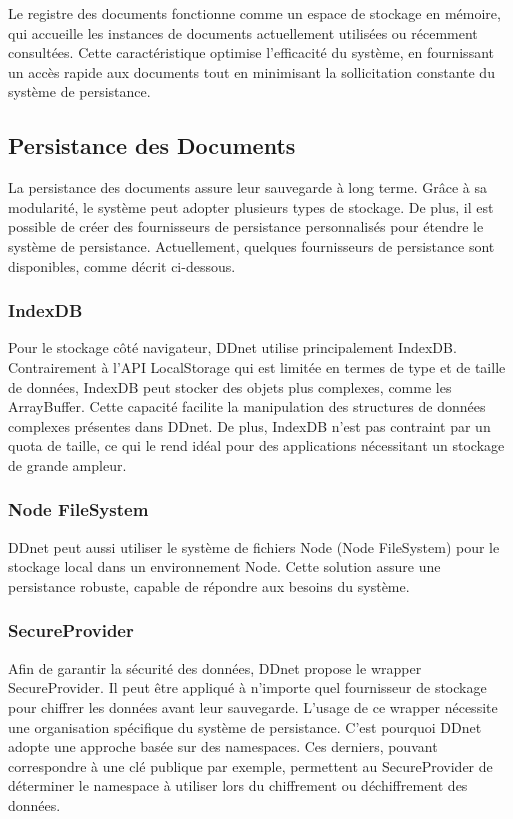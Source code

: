 Le registre des documents fonctionne comme un espace de stockage en mémoire, qui accueille les instances de documents actuellement utilisées ou récemment consultées. Cette caractéristique optimise l'efficacité du système, en fournissant un accès rapide aux documents tout en minimisant la sollicitation constante du système de persistance.

\subsection{Persistance des Documents}

La persistance des documents assure leur sauvegarde à long terme. Grâce à sa modularité, le système peut adopter plusieurs types de stockage. De plus, il est possible de créer des fournisseurs de persistance personnalisés pour étendre le système de persistance. Actuellement, quelques fournisseurs de persistance sont disponibles, comme décrit ci-dessous.

\subsubsection{IndexDB}

Pour le stockage côté navigateur, DDnet utilise principalement IndexDB. Contrairement à l'API LocalStorage qui est limitée en termes de type et de taille de données, IndexDB peut stocker des objets plus complexes, comme les ArrayBuffer. Cette capacité facilite la manipulation des structures de données complexes présentes dans DDnet. De plus, IndexDB n'est pas contraint par un quota de taille, ce qui le rend idéal pour des applications nécessitant un stockage de grande ampleur.

\subsubsection{Node FileSystem}

DDnet peut aussi utiliser le système de fichiers Node (Node FileSystem) pour le stockage local dans un environnement Node. Cette solution assure une persistance robuste, capable de répondre aux besoins du système.

\subsubsection{SecureProvider}

Afin de garantir la sécurité des données, DDnet propose le wrapper SecureProvider. Il peut être appliqué à n'importe quel fournisseur de stockage pour chiffrer les données avant leur sauvegarde. L'usage de ce wrapper nécessite une organisation spécifique du système de persistance. C'est pourquoi DDnet adopte une approche basée sur des namespaces. Ces derniers, pouvant correspondre à une clé publique par exemple, permettent au SecureProvider de déterminer le namespace à utiliser lors du chiffrement ou déchiffrement des données.

